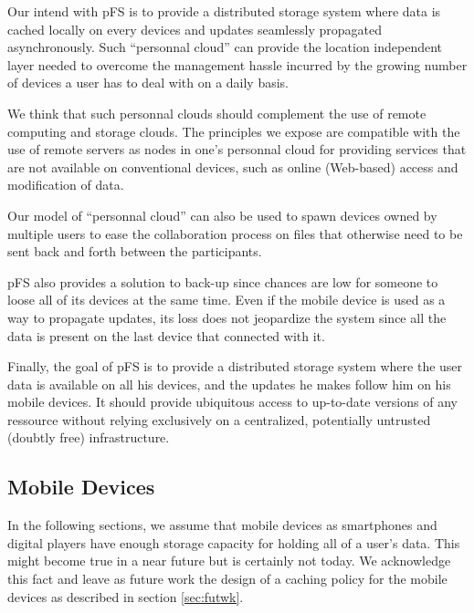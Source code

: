 Our intend with pFS is to provide a distributed storage system where
data is cached locally on every devices and updates seamlessly
propagated asynchronously. Such ``personnal cloud'' can provide the
location independent layer needed to overcome the management hassle
incurred by the growing number of devices a user has to deal with on a
daily basis.

We think that such personnal clouds should complement the use of
remote computing and storage clouds. The principles we expose are
compatible with the use of remote servers as nodes in one's personnal
cloud for providing services that are not available on conventional
devices, such as online (Web-based) access and modification of data.

Our model of ``personnal cloud'' can also be used to spawn devices
owned by multiple users to ease the collaboration process on files that
otherwise need to be sent back and forth between the participants.

pFS also provides a solution to back-up since chances are low
for someone to loose all of its devices at the same time. Even if the
mobile device is used as a way to propagate updates, its loss does not
jeopardize the system since all the data is present on the last device
that connected with it. 

Finally, the goal of pFS is to provide a distributed storage system
where the user data is available on all his devices, and the updates
he makes follow him on his mobile devices. It should provide
ubiquitous access to up-to-date versions of any ressource without
relying exclusively on a centralized, potentially untrusted (doubtly
free) infrastructure.


\subsection {Mobile Devices}

In the following sections, we assume that mobile devices as smartphones and
digital players have enough storage capacity for holding all of a
user's data. This might become true in a near future but is certainly
not today. We acknowledge this fact and leave as future work the
design of a caching policy for the mobile devices as described in section 
\ref{sec:futwk}.


